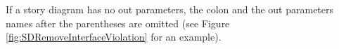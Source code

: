 If a story diagram has no out parameters, the colon and the out parameters names after the parentheses are omitted (see Figure \ref{fig:SDRemoveInterfaceViolation} for an example).




